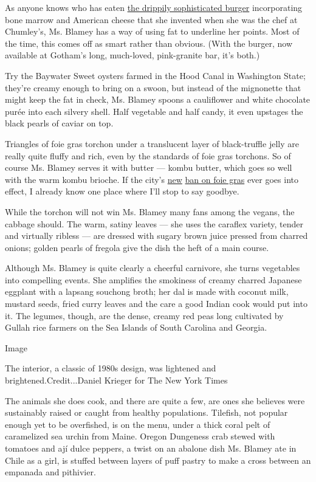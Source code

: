 As anyone knows who has eaten
\href{https://www.nytimes3xbfgragh.onion/2017/01/31/dining/chumleys-review-bar-west-village.html}{the
drippily sophisticated burger} incorporating bone marrow and American
cheese that she invented when she was the chef at Chumley's, Ms. Blamey
has a way of using fat to underline her points. Most of the time, this
comes off as smart rather than obvious. (With the burger, now available
at Gotham's long, much-loved, pink-granite bar, it's both.)

Try the Baywater Sweet oysters farmed in the Hood Canal in Washington
State; they're creamy enough to bring on a swoon, but instead of the
mignonette that might keep the fat in check, Ms. Blamey spoons a
cauliflower and white chocolate purée into each silvery shell. Half
vegetable and half candy, it even upstages the black pearls of caviar on
top.

Triangles of foie gras torchon under a translucent layer of
black-truffle jelly are really quite fluffy and rich, even by the
standards of foie gras torchons. So of course Ms. Blamey serves it with
butter --- kombu butter, which goes so well with the warm kombu brioche.
If the city's
\href{https://www.nytimes3xbfgragh.onion/2019/10/30/nyregion/foie-gras-ban-nyc.html}{new}
\href{https://www.nytimes3xbfgragh.onion/2019/10/30/nyregion/foie-gras-ban-nyc.html}{ban
on foie gras} ever goes into effect, I already know one place where I'll
stop to say goodbye.

While the torchon will not win Ms. Blamey many fans among the vegans,
the cabbage should. The warm, satiny leaves --- she uses the caraflex
variety, tender and virtually ribless --- are dressed with sugary brown
juice pressed from charred onions; golden pearls of fregola give the
dish the heft of a main course.

Although Ms. Blamey is quite clearly a cheerful carnivore, she turns
vegetables into compelling events. She amplifies the smokiness of creamy
charred Japanese eggplant with a lapsang souchong broth; her dal is made
with coconut milk, mustard seeds, fried curry leaves and the care a good
Indian cook would put into it. The legumes, though, are the dense,
creamy red peas long cultivated by Gullah rice farmers on the Sea
Islands of South Carolina and Georgia.

Image

The interior, a classic of 1980s design, was lightened and
brightened.Credit...Daniel Krieger for The New York Times

The animals she does cook, and there are quite a few, are ones she
believes were sustainably raised or caught from healthy populations.
Tilefish, not popular enough yet to be overfished, is on the menu, under
a thick coral pelt of caramelized sea urchin from Maine. Oregon
Dungeness crab stewed with tomatoes and ají dulce peppers, a twist on an
abalone dish Ms. Blamey ate in Chile as a girl, is stuffed between
layers of puff pastry to make a cross between an empanada and pithivier.

